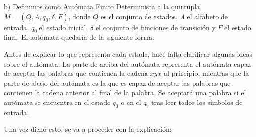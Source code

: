 \documentclass[11pt,a4paper]{article}
\begin{document}
		b) Definimos como Autómata Finito Determinista a la quintupla $M = (Q, A, q_0, \delta, F)$, donde $Q$ es
		el conjunto de estados, $A$ el alfabeto de entrada, $q_0$ el estado inicial, $\delta$ el conjunto de funciones
		de transición y $F$ el estado final. El autómata quedaría de la siguiente forma:
		
		\begin{center}
		\end{center}
		
		Antes de explicar lo que representa cada estado, hace falta clarificar algunas ideas sobre el autómata.
		La parte de arriba del autómata representa el autómata capaz de aceptar las palabras que contienen la cadena
		$xyx$ al principio, mientras que la parte de abajo del autómata es la que es capaz de aceptar las palabras que
		contienen la cadena anterior al final de la palabra. Se aceptará una palabra si el autómata se encuentra en
		el estado $q_3$ o en el $q_7$ tras leer todos los símbolos de entrada. \par
		
		Una vez dicho esto, se 	va a proceder con la explicación:
		
\end{document}

